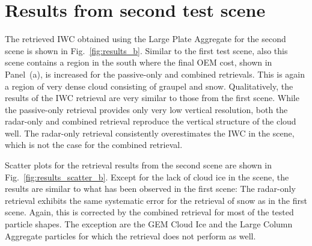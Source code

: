 \documentclass[journal abbreviation, manuscript]{copernicus}
\begin{document}

\clearpage
\appendix


\section{Results from second test scene}

The retrieved IWC obtained using the Large Plate Aggregate for the second scene
is shown in Fig.~\ref{fig:results_b}. Similar to the first test scene, also this
scene contains a region in the south where the final OEM cost, shown in
Panel~(a), is increased for the passive-only and combined retrievals. This is
again a region of very dense cloud consisting of graupel and snow.
Qualitatively, the results of the IWC retrieval are very similar to those from
the first scene. While the passive-only retrieval provides only very low
vertical resolution, both the radar-only and combined retrieval reproduce the
vertical structure of the cloud well. The radar-only retrieval consistently
overestimates the IWC in the scene, which is not the case for the combined
retrieval.

Scatter plots for the retrieval results from the second scene are shown in
Fig.~\ref{fig:results_scatter_b}. Except for the lack of cloud ice in the scene,
the results are similar to what has been observed in the first scene: The
radar-only retrieval exhibits the same systematic error for the retrieval of snow as in
the first scene. Again, this is corrected by the combined retrieval for most of
the tested particle shapes. The exception are the GEM Cloud Ice and the Large
Column Aggregate particles for which the retrieval does not perform as well.

\clearpage
\end{document}
